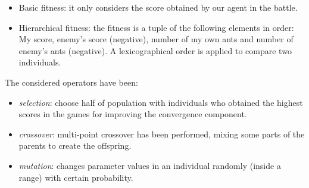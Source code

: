 \documentclass[runningheads]{llncs}
\begin{document}
\begin{itemize}
\item Basic fitness: it only considers the score obtained by our agent in the battle.
\item Hierarchical fitness: the fitness is a tuple of the following elements in order: My score, enemy's score (negative), number of my own ants and number of enemy's ants (negative). A lexicographical order is applied to compare two individuals.
\end{itemize}

The considered operators have been:
\begin{itemize}
\item \textit{selection}: choose half of population with individuals who obtained the highest scores in the games for improving the convergence component.
\item \textit{crossover}: multi-point crossover has been performed, mixing some parts of the parents to create the offspring.
\item \textit{mutation}: changes parameter values in an individual randomly (inside a range) with certain probability.
\end{itemize}


 
\end{document}
